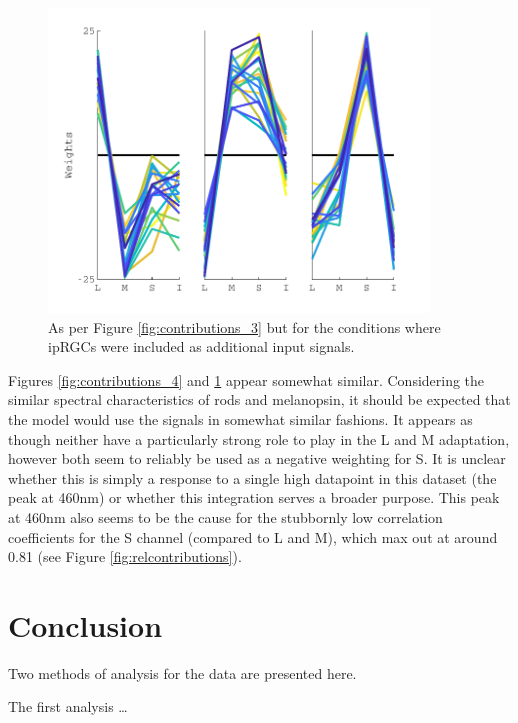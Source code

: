 \begin{figure}[htbp]
\includegraphics[max width=0.9\textwidth]{figs/LargeSphere/contributions_5minusrods.pdf}
\caption{As per Figure \ref{fig:contributions_3} but for the conditions where ipRGCs were included as additional input signals.} 
\label{fig:contributions_5minusrods}
\end{figure}

Figures \ref{fig:contributions_4} and \ref{fig:contributions_5minusrods} appear somewhat similar. Considering the similar spectral characteristics of rods and melanopsin, it should be expected that the model would use the signals in somewhat similar fashions. It appears as though neither have a particularly strong role to play in the L and M adaptation, however both seem to reliably be used as a negative weighting for S. It is unclear whether this is simply a response to a single high datapoint in this dataset (the peak at 460nm) or whether this integration serves a broader purpose. This peak at 460nm also seems to be the cause for the stubbornly low correlation coefficients for the S channel (compared to L and M), which max out at around 0.81 (see Figure \ref{fig:relcontributions}). 

\clearpage

\section{Conclusion}

Two methods of analysis for the \citet{macdonald_chromatic_2013} data are presented here.

The first analysis \dots

